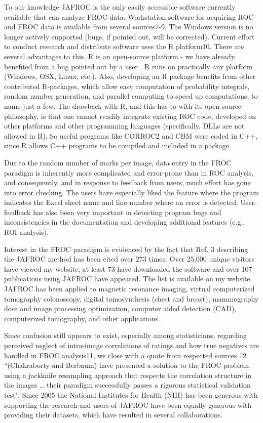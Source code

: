 \documentclass[
]{book}
\begin{document}
To our knowledge JAFROC is the only easily accessible software currently available that can analyze FROC data. Workstation software for acquiring ROC and FROC data is available from several sources7-9. The Windows version is no longer actively supported (bugs, if pointed out, will be corrected). Current effort to conduct research and distribute software uses the R platform10. There are several advantages to this. R is an open-source platform - we have already benefited from a bug pointed out by a user . R runs on practically any platform (Windows, OSX, Linux, etc.). Also, developing an R package benefits from other contributed R-packages, which allow easy computation of probability integrals, random number generation, and parallel computing to speed up computations, to name just a few. The drawback with R, and this has to with its open source philosophy, is that one cannot readily integrate existing ROC code, developed on other platforms and other programming languages (specifically, DLLs are not allowed in R). So useful programs like CORROC2 and CBM were coded in C++, since R allows C++ programs to be compiled and included in a package.

Due to the random number of marks per image, data entry in the FROC paradigm is inherently more complicated and error-prone than in ROC analysis, and consequently, and in response to feedback from users, much effort has gone into error checking. The users have especially liked the feature where the program indicates the Excel sheet name and line-number where an error is detected. User-feedback has also been very important in detecting program bugs and inconsistencies in the documentation and developing additional features (e.g., ROI analysis).

Interest in the FROC paradigm is evidenced by the fact that Ref. 3 describing the JAFROC method has been cited over 273 times. Over 25,000 unique visitors have viewed my website, at least 73 have downloaded the software and over 107 publications using JAFROC have appeared. The list is available on my website. JAFROC has been applied to magnetic resonance imaging, virtual computerized tomography colonoscopy, digital tomosynthesis (chest and breast), mammography dose and image processing optimization, computer aided detection (CAD), computerized tomography, and other applications.

Since confusion still appears to exist, especially among statisticians, regarding perceived neglect of intra-image correlations of ratings and how true negatives are handled in FROC analysis11, we close with a quote from respected sources 12 ``(Chakraborty and Berbaum) have presented a solution to the FROC problem using a jackknife resampling approach that respects the correlation structure in the images \ldots{} their paradigm successfully passes a rigorous statistical validation test''. Since 2005 the National Institutes for Health (NIH) has been generous with supporting the research and users of JAFROC have been equally generous with providing their datasets, which have resulted in several collaborations.
\end{document}
